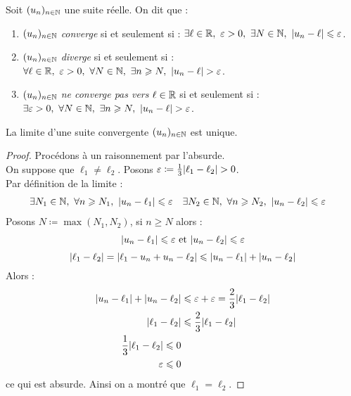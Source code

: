 \begin{definition}
    Soit $(u_n)_{n \in \mathbb{N}}$ une suite réelle. On dit que :
    \begin{enumerate}
        \item $(u_n)_{n \in \mathbb{N}}$ \emph{converge} si et seulement si : $\exists \ell \in \mathbb{R},\ \varepsilon > 0,\ \exists N \in \mathbb{N},\ \abs{u_n - \ell} \leqslant \varepsilon$.
        \item $(u_n)_{n \in \mathbb{N}}$ \emph{diverge} si et seulement si : $\forall \ell \in \R,\ \varepsilon > 0,\ \forall N \in \N,\ \exists n \geq N,\ \abs{u_n - \ell} > \varepsilon$.
        \item $(u_n)_{n \in \mathbb{N}}$ \emph{ne converge pas vers} $\ell \in \mathbb{R}$ si et seulement si : $\exists \varepsilon > 0,\ \forall N \in \mathbb{N},\ \exists n \geqslant N,\ \abs{u_n - \ell} > \varepsilon$.
    \end{enumerate}
\end{definition}

\begin{theorem}
    La limite d'une suite convergente $(u_n)_{n \in \mathbb{N}}$ est unique.
\end{theorem}

\begin{proof}
    Procédons à un raisonnement par l'absurde.
    \\
    On suppose que $\ell_1 \neq \ell_2$. Posons $\varepsilon \coloneqq \frac{1}{3} \abs{\ell_1 - \ell_2} > 0$.
    \\
    Par définition de la limite :
    \begin{align*}
        &\exists N_1 \in \mathbb{N},\ \forall n \geqslant N_1,\ \abs{u_n - \ell_1} \leqslant \varepsilon 
        &
        &\exists N_2 \in \mathbb{N},\ \forall n \geqslant N_2,\ \abs{u_n - \ell_2} \leqslant \varepsilon
    \end{align*}
    Posons $N \coloneqq \max(N_1, N_2)$, si $n \geq N$ alors :
    \begin{align*}
        \abs{u_n - \ell_1} \leqslant \varepsilon \text{ et } \abs{u_n - \ell_2} \leqslant \varepsilon
    \end{align*}
    \[ \abs{\ell_1 - \ell_2} = \abs{\ell_1 - u_n + u_n - \ell_2} \leqslant \abs{u_n - \ell_1} + \abs{u_n - \ell_2} \]
    Alors : 
    \begin{align*}
        \abs{u_n - \ell_1} + \abs{u_n - \ell_2} &\leqslant \varepsilon + \varepsilon = \frac{2}{3} \abs{\ell_1 - \ell_2} \\
        \abs{\ell_1 - \ell_2} &\leqslant \frac{2}{3} \abs{\ell_1 - \ell_2} \\
        \frac{1}{3} \abs{\ell_1 - \ell_2} \leqslant 0 \\
        \varepsilon \leqslant 0
    \end{align*}
    ce qui est absurde. Ainsi on a montré que $\ell_1 = \ell_2$.
\end{proof}

